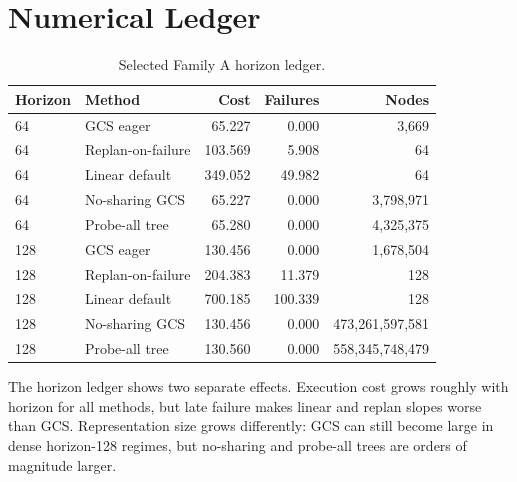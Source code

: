 \documentclass{article}
\begin{document}
\section{Numerical Ledger}
\begin{table}[p]
\centering
\caption{Selected Family A horizon ledger.}
\label{tab:horizon-ledger}
\small
\begin{tabular}{llrrr}
\toprule
Horizon & Method & Cost & Failures & Nodes\\
\midrule
64 & GCS eager & 65.227 & 0.000 & 3{,}669\\
64 & Replan-on-failure & 103.569 & 5.908 & 64\\
64 & Linear default & 349.052 & 49.982 & 64\\
64 & No-sharing GCS & 65.227 & 0.000 & 3{,}798{,}971\\
64 & Probe-all tree & 65.280 & 0.000 & 4{,}325{,}375\\
\midrule
128 & GCS eager & 130.456 & 0.000 & 1{,}678{,}504\\
128 & Replan-on-failure & 204.383 & 11.379 & 128\\
128 & Linear default & 700.185 & 100.339 & 128\\
128 & No-sharing GCS & 130.456 & 0.000 & 473{,}261{,}597{,}581\\
128 & Probe-all tree & 130.560 & 0.000 & 558{,}345{,}748{,}479\\
\bottomrule
\end{tabular}
\end{table}

The horizon ledger shows two separate effects. Execution cost grows roughly with horizon for all methods, but late failure makes linear and replan slopes worse than GCS. Representation size grows differently: GCS can still become large in dense horizon-128 regimes, but no-sharing and probe-all trees are orders of magnitude larger.
\end{document}

